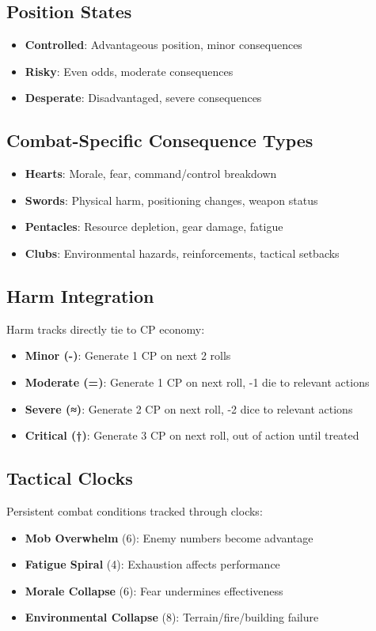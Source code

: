 \documentclass[11pt]{article}
\begin{document}
\subsection{Position States}
\begin{itemize}
    \item \textbf{Controlled}: Advantageous position, minor consequences
    \item \textbf{Risky}: Even odds, moderate consequences  
    \item \textbf{Desperate}: Disadvantaged, severe consequences
\end{itemize}

\subsection{Combat-Specific Consequence Types}
\begin{itemize}
    \item \textbf{Hearts}: Morale, fear, command/control breakdown
    \item \textbf{Swords}: Physical harm, positioning changes, weapon status
    \item \textbf{Pentacles}: Resource depletion, gear damage, fatigue
    \item \textbf{Clubs}: Environmental hazards, reinforcements, tactical setbacks
\end{itemize}

\subsection{Harm Integration}
Harm tracks directly tie to CP economy:
\begin{itemize}
    \item \textbf{Minor (-)}: Generate 1 CP on next 2 rolls
    \item \textbf{Moderate (=)}: Generate 1 CP on next roll, -1 die to relevant actions
    \item \textbf{Severe (≈)}: Generate 2 CP on next roll, -2 dice to relevant actions  
    \item \textbf{Critical (†)}: Generate 3 CP on next roll, out of action until treated
\end{itemize}

\subsection{Tactical Clocks}
Persistent combat conditions tracked through clocks:
\begin{itemize}
    \item \textbf{Mob Overwhelm} (6): Enemy numbers become advantage
    \item \textbf{Fatigue Spiral} (4): Exhaustion affects performance
    \item \textbf{Morale Collapse} (6): Fear undermines effectiveness
    \item \textbf{Environmental Collapse} (8): Terrain/fire/building failure
\end{itemize}
\end{document}
